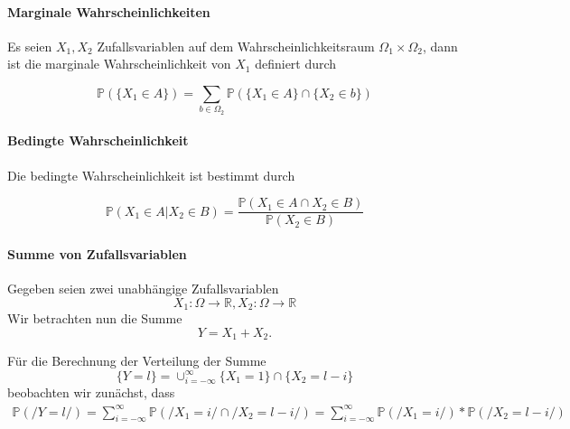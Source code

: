 \paragraph {Marginale Wahrscheinlichkeiten}

Es seien $X_{1}, X_{2}$ Zufallsvariablen auf dem Wahrscheinlichkeitsraum $\Omega_{1}\times \Omega_{2}$, dann ist die marginale Wahrscheinlichkeit von $X_{1}$ definiert durch 

\begin{equation*}
\mathbb{P} (\{X_{1} \in A \} ) = \sum_{b \in \Omega_{2} } \mathbb{P} (\{X_{1} \in A\} \cap \{X_{2} \in b\})
\end{equation*}

\vspace{10pt}

\paragraph {Bedingte Wahrscheinlichkeit}
Die bedingte Wahrscheinlichkeit ist bestimmt durch 

\begin{equation*}
\mathbb{P} ({X_{1} \in A } | { X_{2} \in B } ) = \frac {\mathbb{P} ( {X_{1} \in A } \cap {X_{2} \in B })} {\mathbb{P} ({X_{2} \in B})}
\end{equation*}



\paragraph {Summe von Zufallsvariablen}

Gegeben seien zwei unabhängige Zufallsvariablen
\begin{equation*}
X_{1}:\Omega \longrightarrow \mathbb{R}, X_{2}:\Omega \longrightarrow \mathbb{R}
\end{equation*}
Wir betrachten nun die Summe
\begin{equation*}
Y=X_{1}+X_{2}
.\end{equation*}

F\"ur die Berechnung der Verteilung der Summe 
\begin{equation*}
\{Y=l\}=\cup_{i=-\infty}^{\infty} \{X_{1}=1\} \cap \{X_{2}=l-i\}
\end{equation*}
beobachten wir zun\"achst, dass 
\begin{align*}
\mathbb{P} (/{Y=l/}) = \sum_{i=-\infty}^{\infty} \mathbb{P} (/{X_{1}=i/} \cap /{X_{2}=l-i/}) = \sum_{i=-\infty}^{\infty} \mathbb{P} (/{X_{1} = i/}) * \mathbb{P} (/{X_{2}=l-i/})
\end{align*}

